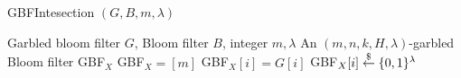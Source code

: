 \begin{algorithm}[htb]
\caption{GBFIntesection $(G, B, m, \lambda)$}
\label{alg:gbfintersection}
\begin{algorithmic}[1]
\REQUIRE Garbled bloom filter $G$, Bloom filter $B$, integer $m, \lambda$
\ENSURE An $(m, n, k, H, \lambda)$-garbled Bloom filter GBF$_X$
\STATE GBF$_X = [m]$ 
    \STATE GBF$_X[i] = G[i]$
  \ELSE
    \STATE GBF$_X[i] \stackrel{\$}{\gets} \{0,1\}^\lambda$
  \ENDIF
\ENDFOR
\end{algorithmic}
\end{algorithm}

% 	
% 	  
% 	
% 	   
% 	
% 	
%   
